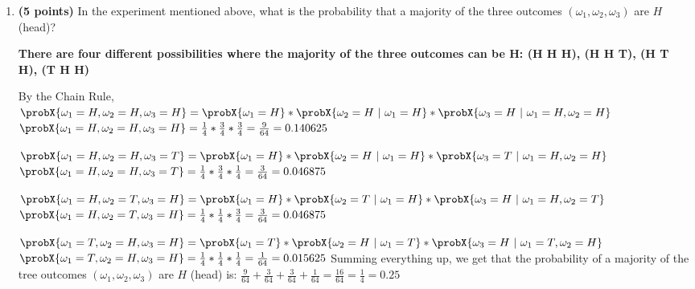 \documentclass[11pt]{article}
\begin{document}
\begin{enumerate}
\begin{enumerate}
    \item {\bfseries (5 points)} 
  In the experiment mentioned above, what is the probability that a majority of the three outcomes $(\omega_1,\omega_2,\omega_3)$ are $H$ (head)?
  \newline
      {\bfseries
        \newline
        There are four different possibilities where the majority of the three outcomes can be H: \newline
        (H H H), (H H T), (H T H), (T H H) \newline

        By the Chain Rule, \newline
        $\probX{\omega_1= H, \omega_2= H, \omega_3= H} = \probX{\omega_1= H} * \probX{\omega_2= H ~|~ \omega_1= H} * \probX{\omega_3= H ~|~ \omega_1= H, \omega_2= H}$ \newline
        $\probX{\omega_1= H, \omega_2= H, \omega_3= H}= \frac{1}{4} * \frac{3}{4} * \frac{3}{4} = \frac{9}{64} = 0.140625$ \newline

        $\probX{\omega_1= H, \omega_2= H, \omega_3= T} = \probX{\omega_1= H} * \probX{\omega_2= H ~|~ \omega_1= H} * \probX{\omega_3= T ~|~ \omega_1= H, \omega_2= H}$ \newline
        $\probX{\omega_1= H, \omega_2= H, \omega_3= T}= \frac{1}{4} * \frac{3}{4} * \frac{1}{4} = \frac{3}{64} = 0.046875$ \newline

        $\probX{\omega_1= H, \omega_2= T, \omega_3= H} = \probX{\omega_1= H} * \probX{\omega_2= T ~|~ \omega_1= H} * \probX{\omega_3= H ~|~ \omega_1= H, \omega_2= T}$ \newline
        $\probX{\omega_1= H, \omega_2= T, \omega_3= H}= \frac{1}{4} * \frac{1}{4} * \frac{3}{4} = \frac{3}{64} = 0.046875$ \newline

        $\probX{\omega_1= T, \omega_2= H, \omega_3= H} = \probX{\omega_1= T} * \probX{\omega_2= H ~|~ \omega_1= T} * \probX{\omega_3= H ~|~ \omega_1= T, \omega_2= H}$ \newline
        $\probX{\omega_1= T, \omega_2= H, \omega_3= H}= \frac{1}{4} * \frac{1}{4} * \frac{1}{4} = \frac{1}{64} = 0.015625$ \newline
        \newline
        Summing everything up, we get that the probability of a majority of the tree outcomes $(\omega_1, \omega_2, \omega_3)$ are $H$ (head) is: \newline
        $\frac{9}{64} + \frac{3}{64} + \frac{3}{64} + \frac{1}{64} = \frac{16}{64} = \frac{1}{4} = 0.25$
      }
      \newpage
      

\end{enumerate}
\end{enumerate}
\end{document}
